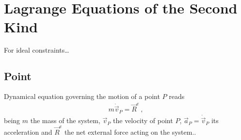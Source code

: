 \documentclass[letterpaper,10pt,english]{jupyterBook}
\begin{document}
\sphinxstepscope


\section{Lagrange Equations of the Second Kind}
\label{\detokenize{ch/lagrange-ii-type:lagrange-equations-of-the-second-kind}}\label{\detokenize{ch/lagrange-ii-type:classical-mechanics-lagrange-ii-type}}\label{\detokenize{ch/lagrange-ii-type::doc}}
\sphinxAtStartPar
For ideal constraints…

\sphinxstepscope




\subsection{Point}
\label{\detokenize{ch/lagrange-point:point}}\label{\detokenize{ch/lagrange-point:classical-mechanics-lagrange-point}}\label{\detokenize{ch/lagrange-point::doc}}
\sphinxAtStartPar
{} Dynamical equation governing the motion of a point \(P\) reads
\begin{equation*}
\begin{split}m \dot{\vec{v}}_P = \vec{R}^e \ ,\end{split}
\end{equation*}
\sphinxAtStartPar
being \(m\) the mass of the system, \(\vec{v}_P\) the velocity of point \(P\), \(\vec{a}_P = \dot{\vec{v}}_P\) its acceleration and \(\vec{R}^{e}\) the net external force acting on the system..
\end{document}
